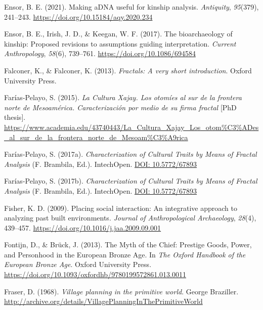 \documentclass[
  12pt,
]{book}
\newlength{\cslhangindent}
\newlength{\cslentryspacingunit} %
\newenvironment{CSLReferences}[2] %
 {%
  \setlength{\parindent}{0pt}
  \ifodd #1
  \let\oldpar\par
  \def\par{\hangindent=\cslhangindent\oldpar}
  \fi
  \setlength{\parskip}{#2\cslentryspacingunit}
 }%
 {}
\begin{document}
\begin{CSLReferences}{1}{0}
\leavevmode{}%
Ensor, B. E. (2021). Making aDNA useful for kinship analysis. \emph{Antiquity}, \emph{95}(379), 241--243. \url{https://doi.org/10.15184/aqy.2020.234}

\leavevmode{}%
Ensor, B. E., Irish, J. D., \& Keegan, W. F. (2017). The bioarchaeology of kinship: Proposed revisions to assumptions guiding interpretation. \emph{Current Anthropology}, \emph{58}(6), 739--761. \url{https://doi.org/10.1086/694584}

\leavevmode{}%
Falconer, K., \& Falconer, K. (2013). \emph{Fractals: A very short introduction}. Oxford University Press.

\leavevmode{}%
Farías-Pelayo, S. (2015). \emph{La Cultura Xajay. Los otomíes al sur de la frontera norte de Mesoamérica. Caracterización por medio de su firma fractal} {[}PhD thesis{]}. \url{https://www.academia.edu/43740443/La_Cultura_Xajay_Los_otom\%C3\%ADes_al_sur_de_la_frontera_norte_de_Mesoam\%C3\%A9rica}

\leavevmode{}%
Farías-Pelayo, S. (2017a). \emph{Characterization of Cultural Traits by Means of Fractal Analysis} (F. Brambila, Ed.). IntechOpen. \href{https://DOI:\%2010.5772/67893}{DOI: 10.5772/67893}

\leavevmode{}%
Farías-Pelayo, S. (2017b). \emph{Characterization of Cultural Traits by Means of Fractal Analysis} (F. Brambila, Ed.). IntechOpen. \href{https://DOI:\%2010.5772/67893}{DOI: 10.5772/67893}

\leavevmode{}%
Fisher, K. D. (2009). Placing social interaction: An integrative approach to analyzing past built environments. \emph{Journal of Anthropological Archaeology}, \emph{28}(4), 439--457. \url{https://doi.org/10.1016/j.jaa.2009.09.001}

\leavevmode{}%
Fontijn, D., \& Brück, J. (2013). The {Myth} of the {Chief}: {Prestige Goods}, {Power}, and {Personhood} in the {European Bronze Age}. In \emph{The {Oxford Handbook} of the {European Bronze Age}}. {Oxford University Press}. \url{https://doi.org/10.1093/oxfordhb/9780199572861.013.0011}

\leavevmode{}%
Fraser, D. (1968). \emph{Village planning in the primitive world}. George Braziller. \url{http://archive.org/details/VillagePlanningInThePrimitiveWorld}


\end{CSLReferences}
\end{document}
